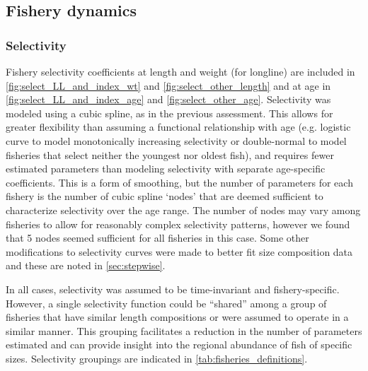 \subsection{Fishery dynamics}
\label{sec:model_fihsery_dynamics}

\subsubsection{Selectivity}
\label{sec:model_selectivity}

Fishery selectivity coefficients at length and weight (for longline) are included in \autoref{fig:select_LL_and_index_wt} and \autoref{fig:select_other_length} and at age in \autoref{fig:select_LL_and_index_age} and \autoref{fig:select_other_age}. Selectivity was modeled using a cubic spline, as in the previous assessment. This allows for greater flexibility than assuming a functional relationship with age (e.g. logistic curve to model monotonically increasing selectivity or double-normal to model fisheries that select neither the youngest nor oldest fish), and requires fewer estimated parameters than modeling selectivity with separate age-specific coefficients. This is a form of smoothing, but the number of parameters for each fishery is the number of cubic spline `nodes' that are deemed sufficient to characterize selectivity over the age range. The number of nodes may vary among fisheries to allow for reasonably complex selectivity patterns, however we found that 5 nodes seemed sufficient for all fisheries in this case. Some other modifications to selectivity curves were made to better fit size composition data and these are noted in \autoref{sec:stepwise}.

In all cases, selectivity was assumed to be time-invariant and fishery-specific. However, a single selectivity function could be ``shared'' among a group of fisheries that have similar length compositions or were assumed to operate in a similar manner. This grouping facilitates a reduction in the number of parameters estimated and can provide insight into the regional abundance of fish of specific sizes. Selectivity groupings are indicated in \autoref{tab:fisheries_definitions}.

